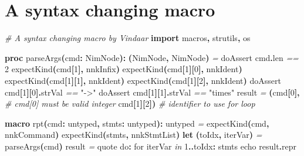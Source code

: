 \documentclass[
  12pt,
]{book}
\newenvironment{Shaded}{}{}
\newcommand{\CommentTok}[1]{\textcolor[rgb]{0.38,0.63,0.69}{\textit{#1}}}
\newcommand{\DataTypeTok}[1]{\textcolor[rgb]{0.56,0.13,0.00}{#1}}
\newcommand{\DecValTok}[1]{\textcolor[rgb]{0.25,0.63,0.44}{#1}}
\newcommand{\KeywordTok}[1]{\textcolor[rgb]{0.00,0.44,0.13}{\textbf{#1}}}
\newcommand{\NormalTok}[1]{#1}
\newcommand{\OtherTok}[1]{\textcolor[rgb]{0.00,0.44,0.13}{#1}}
\newcommand{\StringTok}[1]{\textcolor[rgb]{0.25,0.44,0.63}{#1}}
\begin{document}
\chapter{A syntax changing macro}\label{a-syntax-changing-macro}

\begin{Shaded}
\begin{Highlighting}[]
\CommentTok{\# A syntax changing macro by Vindaar}
\KeywordTok{import}\NormalTok{ macros}\KeywordTok{,}\NormalTok{ strutils}\KeywordTok{,}\NormalTok{ os}

\KeywordTok{proc }\StringTok{parseArgs}\KeywordTok{(}\NormalTok{cmd}\KeywordTok{:} \DataTypeTok{NimNode}\KeywordTok{):} \KeywordTok{(}\DataTypeTok{NimNode}\KeywordTok{,} \DataTypeTok{NimNode}\KeywordTok{)} \CommentTok{=}
  \DataTypeTok{doAssert}\NormalTok{ cmd}\KeywordTok{.}\DataTypeTok{len} \CommentTok{==} \DecValTok{2}
  \DataTypeTok{expectKind}\KeywordTok{(}\NormalTok{cmd}\KeywordTok{[}\DecValTok{1}\KeywordTok{],}\NormalTok{ nnkInfix}\KeywordTok{)}
  \DataTypeTok{expectKind}\KeywordTok{(}\NormalTok{cmd}\KeywordTok{[}\DecValTok{1}\KeywordTok{][}\DecValTok{0}\KeywordTok{],}\NormalTok{ nnkIdent}\KeywordTok{)}
  \DataTypeTok{expectKind}\KeywordTok{(}\NormalTok{cmd}\KeywordTok{[}\DecValTok{1}\KeywordTok{][}\DecValTok{1}\KeywordTok{],}\NormalTok{ nnkIdent}\KeywordTok{)}
  \DataTypeTok{expectKind}\KeywordTok{(}\NormalTok{cmd}\KeywordTok{[}\DecValTok{1}\KeywordTok{][}\DecValTok{2}\KeywordTok{],}\NormalTok{ nnkIdent}\KeywordTok{)}
  \DataTypeTok{doAssert}\NormalTok{ cmd}\KeywordTok{[}\DecValTok{1}\KeywordTok{][}\DecValTok{0}\KeywordTok{].}\DataTypeTok{strVal} \CommentTok{==} \StringTok{"{-}\textgreater{}"}
  \DataTypeTok{doAssert}\NormalTok{ cmd}\KeywordTok{[}\DecValTok{1}\KeywordTok{][}\DecValTok{1}\KeywordTok{].}\DataTypeTok{strVal} \CommentTok{==} \StringTok{"times"}
  \OtherTok{result} \CommentTok{=} \KeywordTok{(}\DataTypeTok{cmd}\KeywordTok{[}\DecValTok{0}\KeywordTok{],} \CommentTok{\# cmd[0] must be valid integer}
\NormalTok{            cmd}\KeywordTok{[}\DecValTok{1}\KeywordTok{][}\DecValTok{2}\KeywordTok{])} \CommentTok{\# identifier to use for loop}

\KeywordTok{macro }\StringTok{rpt}\KeywordTok{(}\NormalTok{cmd}\KeywordTok{:} \DataTypeTok{untyped}\KeywordTok{,}\NormalTok{ stmts}\KeywordTok{:} \DataTypeTok{untyped}\KeywordTok{):} \DataTypeTok{untyped} \CommentTok{=}
  \DataTypeTok{expectKind}\KeywordTok{(}\NormalTok{cmd}\KeywordTok{,}\NormalTok{ nnkCommand}\KeywordTok{)}
  \DataTypeTok{expectKind}\KeywordTok{(}\NormalTok{stmts}\KeywordTok{,}\NormalTok{ nnkStmtList}\KeywordTok{)}
  \KeywordTok{let} \KeywordTok{(}\NormalTok{toIdx}\KeywordTok{,}\NormalTok{ iterVar}\KeywordTok{)} \CommentTok{=} \DataTypeTok{parseArgs}\KeywordTok{(}\NormalTok{cmd}\KeywordTok{)}
  \OtherTok{result} \CommentTok{=} \DataTypeTok{quote} \DataTypeTok{do}\KeywordTok{:}
    \DataTypeTok{for}\NormalTok{ \textasciigrave{}iterVar\textasciigrave{} }\CommentTok{in} \DecValTok{1}\KeywordTok{..}\NormalTok{\textasciigrave{}toIdx\textasciigrave{}}\KeywordTok{:}
\NormalTok{      \textasciigrave{}stmts\textasciigrave{}}
  \DataTypeTok{echo} \OtherTok{result}\KeywordTok{.}\DataTypeTok{repr}


\end{Highlighting}
\end{Shaded}
\end{document}

